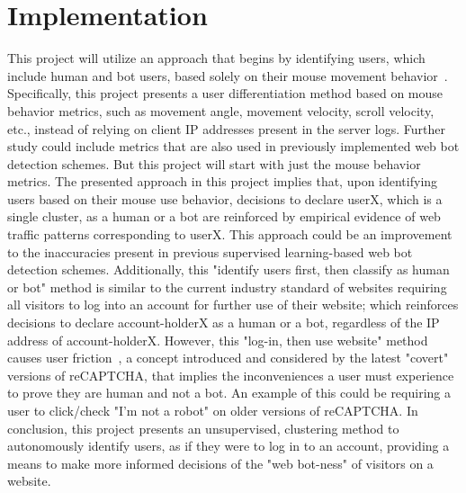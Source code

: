 ﻿
\chapter{Implementation}\label{ch:implementation}
This project will utilize an approach that begins by identifying users, which include human and bot users, based solely on their mouse movement behavior~\cite{intrustion_detection_using_mouse_dynamics}.
Specifically, this project presents a user differentiation method based on mouse behavior metrics, such as movement angle, movement velocity, scroll velocity, etc., instead of relying on client IP addresses present in the server logs.
Further study could include metrics that are also used in previously implemented web bot detection schemes.
But this project will start with just the mouse behavior metrics.
The presented approach in this project implies that, upon identifying users based on their mouse use behavior, decisions to declare userX, which is a single cluster, as a human or a bot are reinforced by empirical evidence of web traffic patterns corresponding to userX.
This approach could be an improvement to the inaccuracies present in previous supervised learning-based web bot detection schemes.
Additionally, this "identify users first, then classify as human or bot" method is similar to the current industry standard of websites requiring all visitors to log into an account for further use of their website; which reinforces decisions to declare account-holderX as a human or a bot, regardless of the IP address of account-holderX.
However, this "log-in, then use website" method causes user friction~\cite{how_recaptcha_is_improving_user_experience}, a concept introduced and considered by the latest "covert" versions of reCAPTCHA, that implies the inconveniences a user must experience to prove they are human and not a bot.
An example of this could be requiring a user to click/check "I'm not a robot" on older versions of reCAPTCHA.
In conclusion, this project presents an unsupervised, clustering method to autonomously identify users, as if they were to log in to an account, providing a means to make more informed decisions of the "web bot-ness" of visitors on a website.

